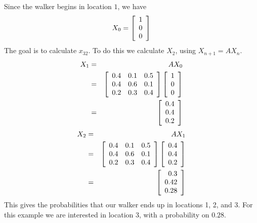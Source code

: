 \begin{solution}
Since the walker begins in location $1$, we have 
\[
X_{0} = \left[
\begin{array}{c}
1 \\
0 \\
0
\end{array}
\right]
\]
The goal is to calculate $x_{32}$. To do this we calculate $X_{2}$, using $X_{n+1} = AX_{n}$.
\begin{eqnarray*}
X_{1} &=& A X_{0} \\
&=& \left[
\begin{array}{rrr}
0.4 & 0.1 & 0.5 \\
0.4 & 0.6 & 0.1 \\
0.2 & 0.3 & 0.4
\end{array}
\right] \left[
\begin{array}{c}
1 \\
0 \\
0
\end{array}
\right] \\
&=& 
\left[ 
\begin{array}{r}
0.4 \\
0.4 \\
0.2
\end{array}
\right] \\
\end{eqnarray*}
\begin{eqnarray*}
X_{2} &=& A X_{1} \\
&=& \left[
\begin{array}{rrr}
0.4 & 0.1 & 0.5 \\
0.4 & 0.6 & 0.1 \\
0.2 & 0.3 & 0.4
\end{array}
\right] \left[
\begin{array}{c}
0.4 \\
0.4 \\
0.2
\end{array}
\right] \\
&=& 
\left[ 
\begin{array}{r}
0.3 \\
0.42 \\
0.28
\end{array}
\right] \\
\end{eqnarray*}
This gives the probabilities that our walker ends up in locations 1, 2, and 3. For this example we are interested in location 3, with a probability on $0.28$.
\end{solution}

